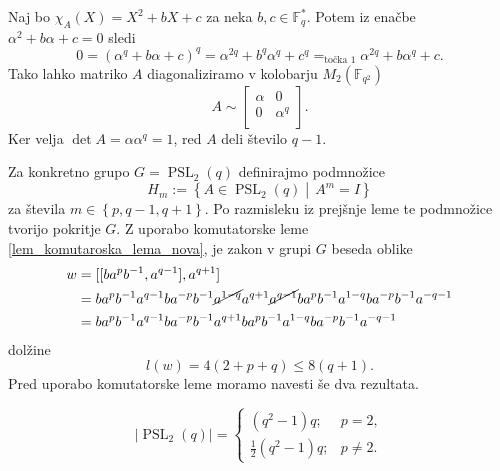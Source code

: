 \documentclass[mat1, tisk]{fmfdelo}
\numberwithin{equation}{section}  %
\begin{document}
\begin{dokaz}
\begin{enumerate}
    Naj bo $\chi_A(X) = X^2 + bX + c$ za neka $b ,c \in \mathbb{F}_q^{*}$. Potem iz enačbe $\alpha^2 + b \alpha + c  = 0$ sledi \begin{equation*}
    0 = (\alpha^{q} + b \alpha + c)^q =  \alpha^{2q} + b^{q} \alpha^{q} + c^{q} =_\text{točka 1} \alpha^{2q} + b \alpha^{q} + c.    
    \end{equation*}  
    Tako lahko matriko $A$ diagonaliziramo v kolobarju $M_2(\mathbb{F}_{q^2})$ \begin{equation*}
    A \sim  \begin{bmatrix}
        \alpha & 0\\
        0 & \alpha^{q}\\
    \end{bmatrix}.
    \end{equation*}  
    Ker velja $\det A = \alpha \alpha^{q} = 1$, red $A$ deli število $q-1$.
    \end{enumerate}   
\end{dokaz}
    Za konkretno grupo $G = \operatorname{PSL}_2(q)$ definirajmo podmnožice \begin{equation*}
        H_m := \left\{ A \in \operatorname{PSL}_2(q)  \middle|\,  A^{m} = I \right\}
    \end{equation*}  
       za števila $m \in \left\{ p, q-1 , q+1\right\}$.
    Po razmisleku iz prejšnje leme te podmnožice tvorijo pokritje $G$. Z uporabo komutatorske leme \ref{lem_komutaroska_lema_nova}, je zakon v grupi $G$ beseda oblike \begin{align*}
        w &= [[b a^{p} b^{-1}, a^{q-1}], a^{q + 1}]  \\
         &= b a^{p} b^{-1} a^{q-1} b a^{-p} b^{-1} \cancel{ a^{1 - q}} a^{q + 1} \cancel{a^{q -1}} b a^{p} b^{-1} a^{1 - q} b a^{-p} b^{-1} a^{- q - 1} \\ 
         &= b a^{p} b^{-1} a^{q-1} b a^{-p} b^{-1}  a^{q + 1}  b a^{p} b^{-1} a^{1 - q} b a^{-p} b^{-1} a^{- q - 1} 
    \end{align*}  
    dolžine \begin{equation*} 
    l(w) = 4(2 + p + q) \le 8(q + 1). 
    \end{equation*}
    Pred uporabo komutatorske leme moramo navesti še dva rezultata.
    \begin{lema}
    \label{lem_velikost_grupe_psl2q}
    \begin{equation*}
        \lvert \operatorname{PSL}_2(q) \rvert   = \begin{cases}
            (q^2 - 1) q; & p = 2,  \\
            \frac{1}{2} (q^2 - 1) q ; & p \neq 2.
        \end{cases}
     \end{equation*} 
    \end{lema}
\end{document}
